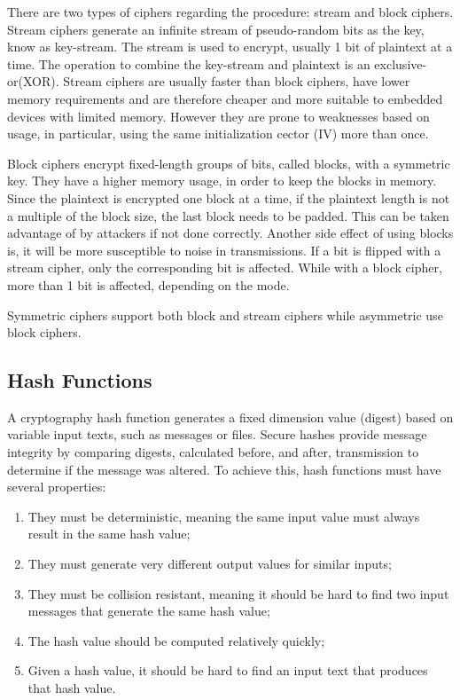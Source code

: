 There are two types of ciphers regarding the procedure: stream and block ciphers.
Stream ciphers generate an infinite stream of pseudo-random bits as the key, know as key-stream. The stream is used to encrypt, usually 1 bit of plaintext at a time. The operation to combine the key-stream and plaintext is an exclusive-or(XOR). Stream ciphers are usually faster than block ciphers, have lower memory requirements and are therefore cheaper and more suitable to embedded devices with limited memory. However they are prone to weaknesses based on usage, in particular, using the same initialization cector (IV) more than once. 

Block ciphers encrypt fixed-length groups of bits, called blocks, with a symmetric key. They have a higher memory usage, in order to keep the blocks in memory. Since the plaintext is encrypted one block at a time, if the plaintext length is not a multiple of the block size, the last block needs to be padded. This can be taken advantage of by attackers if not done correctly. Another side effect of using blocks is, it will be more susceptible to noise in transmissions. If a bit is flipped with a stream cipher, only the corresponding bit is affected. While with a block cipher, more than 1 bit is affected, depending on the mode.

Symmetric ciphers support both block and stream ciphers while asymmetric use block ciphers.

\subsection{Hash Functions}  \label{crypto:hash}

A cryptography hash function generates a fixed dimension value (digest) based on variable input texts, such as messages or files. Secure hashes provide message integrity by comparing digests, calculated before, and after, transmission to determine if the message was altered. To achieve this, hash functions must have several properties:
\begin{enumerate}
    \item They must be deterministic, meaning the same input value must always result in the same hash value;
    \item They must generate very different output values for similar inputs;
    \item They must be collision resistant, meaning it should be hard to find two input messages that generate the same hash value;
    \item The hash value should be computed relatively quickly;
    \item Given a hash value, it should be hard to find an input text that produces that hash value.
\end{enumerate}

